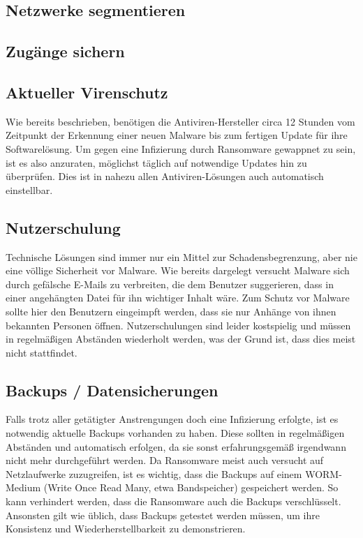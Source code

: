 \subsection{Netzwerke segmentieren}
\subsection{Zugänge sichern}
\subsection{Aktueller Virenschutz}

	Wie bereits beschrieben, benötigen die Antiviren-Hersteller circa 12 Stunden vom Zeitpunkt der Erkennung einer neuen Malware bis zum fertigen Update für ihre Softwarelösung. Um gegen eine Infizierung durch Ransomware gewappnet zu sein, ist es also anzuraten, möglichst täglich auf notwendige Updates hin zu überprüfen. Dies ist in nahezu allen Antiviren-Lösungen auch automatisch einstellbar.

\subsection{Nutzerschulung}

	Technische Lösungen sind immer nur ein Mittel zur Schadensbegrenzung, aber nie eine völlige Sicherheit vor Malware. Wie bereits dargelegt versucht Malware sich durch gefälsche E-Mails zu verbreiten, die dem Benutzer suggerieren, dass in einer angehängten Datei für ihn wichtiger Inhalt wäre. Zum Schutz vor Malware sollte hier den Benutzern eingeimpft werden, dass sie nur Anhänge von ihnen bekannten Personen öffnen. Nutzerschulungen sind leider kostspielig und müssen in regelmäßigen Abständen wiederholt werden, was der Grund ist, dass dies meist nicht stattfindet.


\subsection{Backups / Datensicherungen}

	Falls trotz aller getätigter Anstrengungen doch eine Infizierung erfolgte, ist es notwendig aktuelle Backups vorhanden zu haben. Diese sollten in regelmäßigen Abständen und automatisch erfolgen, da sie sonst erfahrungsgemäß irgendwann nicht mehr durchgeführt werden. Da Ransomware meist auch versucht auf Netzlaufwerke zuzugreifen, ist es wichtig, dass die Backups auf einem WORM-Medium (Write Once Read Many, etwa Bandspeicher) gespeichert werden. So kann verhindert werden, dass die Ransomware auch die Backups verschlüsselt.\\
	Ansonsten gilt wie üblich, dass Backups getestet werden müssen, um ihre Konsistenz und Wiederherstellbarkeit zu demonstrieren.
	
